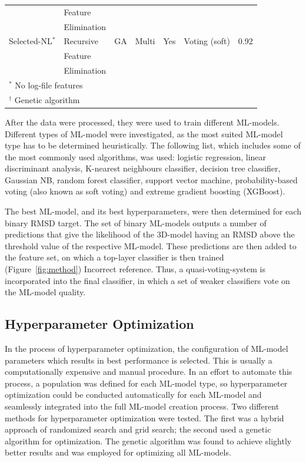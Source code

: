 \documentclass[12pt]{article}
\newcommand{\lilian}[1]{ {\color{red}{\bfseries Lilian:} #1}}
\begin{document}
\begin{table}
\begin{tabular}{lllllll}
                    & Feature       &                   &          &           &               &      \\
                    & Elimination   &                   &          &           &               &      \\
    Selected-NL$^*$ & Recursive     & GA                & Multi    & Yes       & Voting (soft) & 0.92 \\
                    & Feature       &                   &          &           &               &      \\
                    & Elimination   &                   &          &           &               &      \\ \hline
    \multicolumn{7}{l}{$^*$ No log-file features} \\
    \multicolumn{7}{l}{$^\dag$ Genetic algorithm} \\
    \end{tabular}
\end{table}

After the data were processed, they were used to train different
ML-models. Different types of ML-model were investigated, as the most
suited ML-model type has to be determined heuristically. 
The following list, which includes some of the most commonly used
algorithms, was used: logistic regression, linear discriminant analysis,
K-nearest neighbours classifier, decision tree classifier, Gaussian
NB, random forest classifier, support vector machine,
probability-based voting (also known as soft voting) and extreme
gradient boosting (XGBoost)\cite{Chen2016}.

The best ML-model, and its best hyperparameters, were then determined for
each binary RMSD target. The set of binary ML-models outputs a number of
predictions that give the likelihood of the 3D-model having an RMSD above
the threshold value of the respective ML-model. These predictions are
then added to the feature set, on which a top-layer classifier is then
trained (Figure~\ref{fig:method})\lilian{Incorrect reference}. Thus, a quasi-voting-system is incorporated into the final
classifier, in which a set of weaker classifiers vote on the ML-model
quality.

\subsection{Hyperparameter Optimization}
In the process of hyperparameter optimization, the configuration of
ML-model parameters which results in best performance is selected. This
is usually a computationally expensive and manual procedure.
In an effort to automate this process, a population was defined for
each ML-model type, so hyperparameter optimization could be conducted
automatically for each ML-model and seamlessly integrated into the full
ML-model creation process. Two different methods for hyperparameter
optimization were tested. The first was a hybrid approach of randomized
search and grid search; the second used a genetic algorithm for
optimization. The genetic algorithm was found to achieve slightly
better results and was employed for optimizing all ML-models.
\end{document}
